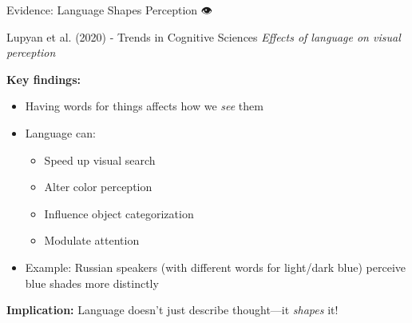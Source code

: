 \documentclass[aspectratio=169]{beamer}
\begin{document}
\begin{frame}[shrink=10]{Evidence: Language Shapes Perception 👁️}
\small
\begin{block}{Lupyan et al. (2020) - Trends in Cognitive Sciences}
\textit{Effects of language on visual perception}
\end{block}

\vspace{0.2cm}

\textbf{Key findings:}
\begin{itemize}\setlength{\itemsep}{0pt}\setlength{\itemsep}{0pt}
    \item Having words for things affects how we \textit{see} them
    \item Language can:
    \begin{itemize}\setlength{\itemsep}{0pt}\setlength{\itemsep}{0pt}
        \item Speed up visual search
        \item Alter color perception
        \item Influence object categorization
        \item Modulate attention
    \end{itemize}
    \item Example: Russian speakers (with different words for light/dark blue) perceive blue shades more distinctly
\end{itemize}

\vspace{0.2cm}

\textbf{Implication:} Language doesn't just describe thought—it \textit{shapes} it!
\end{frame}
\end{document}
